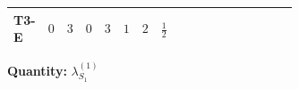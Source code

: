 \documentclass[8pt]{article}
\begin{document}
\begin{landscape}
\begin{longtable}{@{}llcccccc >{\raggedright\arraybackslash}p{0.21\linewidth} >{\raggedright\arraybackslash}p{0.21\linewidth} >{\raggedright\arraybackslash}p{0.21\linewidth}@{}}
\midrule
T3-E & $0$ & $3$ & $0$ & $3$ & $1$ & $2$ & $\frac{1}{2}$ & \scriptsize\adjustbox{max width=\linewidth}{$\begin{gathered} {\lambda_{S_1}^{(1)}} (4 T_{\nu}^{(1)}+14 {\lambda_{S_1}^{(A)}})\end{gathered}$} & \scriptsize\adjustbox{max width=\linewidth}{$\begin{gathered} +2 {\lambda_{S_1}^{(A)}} T_{\nu}^{(1)}\end{gathered}$} & \scriptsize\adjustbox{max width=\linewidth}{$\begin{gathered} +21 {g_2}^4\end{gathered}$} \\
\midrule
\bottomrule
\end{longtable}
\clearpage
\noindent\textbf{Quantity: }$\lambda_{S_1}^{(1)}$\par\smallskip

\end{landscape}
\end{document}

